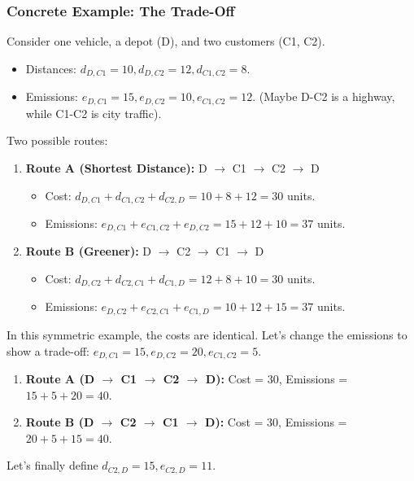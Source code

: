 \documentclass{article}
\begin{document}
\subsubsection{Concrete Example: The Trade-Off}
Consider one vehicle, a depot (D), and two customers (C1, C2).
\begin{itemize}
    \item Distances: $d_{D,C1}=10, d_{D,C2}=12, d_{C1,C2}=8$.
    \item Emissions: $e_{D,C1}=15, e_{D,C2}=10, e_{C1,C2}=12$. (Maybe D-C2 is a highway, while C1-C2 is city traffic).
\end{itemize}
Two possible routes:
\begin{enumerate}
    \item \textbf{Route A (Shortest Distance):} D $\rightarrow$ C1 $\rightarrow$ C2 $\rightarrow$ D
        \begin{itemize}
            \item Cost: $d_{D,C1} + d_{C1,C2} + d_{C2,D} = 10 + 8 + 12 = 30$ units.
            \item Emissions: $e_{D,C1} + e_{C1,C2} + e_{D,C2} = 15 + 12 + 10 = 37$ units.
        \end{itemize}
    \item \textbf{Route B (Greener):} D $\rightarrow$ C2 $\rightarrow$ C1 $\rightarrow$ D
        \begin{itemize}
            \item Cost: $d_{D,C2} + d_{C2,C1} + d_{C1,D} = 12 + 8 + 10 = 30$ units.
            \item Emissions: $e_{D,C2} + e_{C2,C1} + e_{C1,D} = 10 + 12 + 15 = 37$ units.
        \end{itemize}
\end{enumerate}
In this symmetric example, the costs are identical. Let's change the emissions to show a trade-off: $e_{D,C1}=15, e_{D,C2}=20, e_{C1,C2}=5$.
\begin{enumerate}
    \item \textbf{Route A (D $\rightarrow$ C1 $\rightarrow$ C2 $\rightarrow$ D):} Cost = 30, Emissions = $15 + 5 + 20 = 40$.
    \item \textbf{Route B (D $\rightarrow$ C2 $\rightarrow$ C1 $\rightarrow$ D):} Cost = 30, Emissions = $20 + 5 + 15 = 40$.
\end{enumerate}
Let's finally define $d_{C2,D} = 15, e_{C2,D} = 11$.
\end{document}

